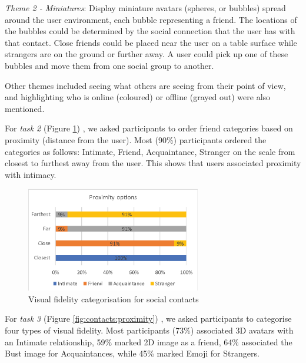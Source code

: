 \textit{Theme 2 - Miniatures}: Display miniature avatars (spheres, or bubbles) spread around the user environment, each bubble representing a friend. The locations of the bubbles could be determined by the social connection that the user has with that contact. Close friends could be placed near the user on a table surface while strangers are on the ground or further away. A user could pick up one of these bubbles and move them from one social group to another. 

Other themes included seeing what others are seeing from their point of view, and highlighting who is online (coloured) or offline (grayed out) were also mentioned.




For \textit{task 2} 
(Figure \ref{fig:contacts:visual-fidelity})
, we asked participants to order friend categories based on proximity (distance from the user). Most (90\%) participants ordered the categories as follows: Intimate, Friend, Acquaintance, Stranger on the scale from closest to furthest away from the user. This shows that users associated proximity with intimacy.

\begin{figure}[ht]
	\centering
	\includegraphics[width=3in]{images/analysis-images-06.eps}
	\caption{Visual fidelity categorisation for social contacts}
	\label{fig:contacts:visual-fidelity}
\end{figure}

For \textit{task 3} 
(Figure \ref{fig:contacts:proximity})
, we asked participants to categorise four types of visual fidelity. Most participants (73\%) associated 3D avatars with an Intimate relationship, 59\% marked 2D image as a  friend, 64\% associated the Bust image for Acquaintances, while 45\% marked Emoji for Strangers.

